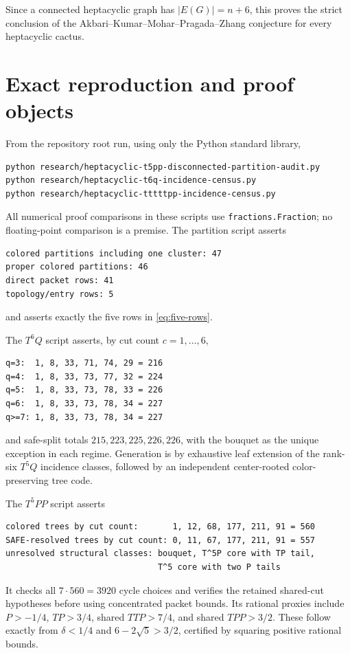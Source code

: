 \documentclass[11pt]{article}
\begin{document}
Since a connected heptacyclic graph has $|E(G)|=n+6$, this proves the strict
conclusion of the Akbari--Kumar--Mohar--Pragada--Zhang conjecture
\cite[Conjecture~1.2]{AKMPZ} for every heptacyclic cactus.

\appendix
\section{Exact reproduction and proof objects}\label{app:reproduction}

From the repository root run, using only the Python standard library,
\begin{verbatim}
python research/heptacyclic-t5pp-disconnected-partition-audit.py
python research/heptacyclic-t6q-incidence-census.py
python research/heptacyclic-tttttpp-incidence-census.py
\end{verbatim}
All numerical proof comparisons in these scripts use
\texttt{fractions.Fraction}; no floating-point comparison is a premise.  The
partition script asserts
\begin{verbatim}
colored partitions including one cluster: 47
proper colored partitions: 46
direct packet rows: 41
topology/entry rows: 5
\end{verbatim}
and asserts exactly the five rows in \eqref{eq:five-rows}.

The $T^6Q$ script asserts, by cut count $c=1,\ldots,6$,
\begin{verbatim}
q=3:  1, 8, 33, 71, 74, 29 = 216
q=4:  1, 8, 33, 73, 77, 32 = 224
q=5:  1, 8, 33, 73, 78, 33 = 226
q=6:  1, 8, 33, 73, 78, 34 = 227
q>=7: 1, 8, 33, 73, 78, 34 = 227
\end{verbatim}
and safe-split totals $215,223,225,226,226$, with the bouquet as the unique
exception in each regime.  Generation is by exhaustive leaf extension of the
rank-six $T^5Q$ incidence classes, followed by an independent center-rooted
color-preserving tree code.

The $T^5PP$ script asserts
\begin{verbatim}
colored trees by cut count:       1, 12, 68, 177, 211, 91 = 560
SAFE-resolved trees by cut count: 0, 11, 67, 177, 211, 91 = 557
unresolved structural classes: bouquet, T^5P core with TP tail,
                               T^5 core with two P tails
\end{verbatim}
It checks all $7\cdot560=3920$ cycle choices and verifies the retained
shared-cut hypotheses before using concentrated packet bounds.  Its rational
proxies include $P>-1/4$, $TP>3/4$, shared $TTP>7/4$, and shared
$TPP>3/2$.  These follow exactly from $\delta<1/4$ and
$6-2\sqrt5>3/2$, certified by squaring positive rational bounds.
\end{document}
